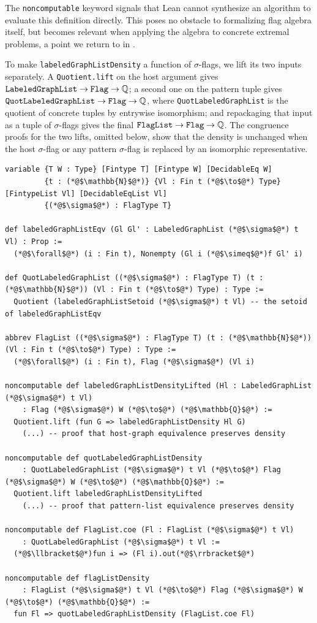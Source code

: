 \documentclass[acmsmall,screen=true,acmthm=false]{acmart}
\DeclareRobustCommand{\lean}[1]{{\def\_{\textunderscore\allowbreak}\texttt{#1}}}
\begin{document}
The \lean{noncomputable} keyword signals that Lean cannot synthesize an
algorithm to evaluate this definition directly.  This poses no obstacle to
formalizing flag algebra itself, but becomes relevant when applying the algebra
to concrete extremal problems, a point we return to in .

To make \lean{labeledGraphListDensity} a function of $\sigma$-flags, we lift
its two inputs separately.  A \lean{Quotient.lift} on the host argument gives
\(\lean{LabeledGraphList}\to\lean{Flag}\to\mathbb{Q}\); a second one on the
pattern tuple gives
\(\lean{QuotLabeledGraphList}\to\lean{Flag}\to\mathbb{Q}\), where
\lean{QuotLabeledGraphList} is the quotient of concrete tuples by entrywise
isomorphism; and repackaging that input as a tuple of $\sigma$-flags gives the
final \(\lean{FlagList}\to\lean{Flag}\to\mathbb{Q}\).  The congruence proofs
for the two lifts, omitted below, show that the density is unchanged when the
host $\sigma$-flag or any pattern $\sigma$-flag is replaced by an isomorphic
representative.
\begin{lstlisting}
variable {T W : Type} [Fintype T] [Fintype W] [DecidableEq W]
         {t : (*@$\mathbb{N}$@*)} {Vl : Fin t (*@$\to$@*) Type} [FintypeList Vl] [DecidableEqList Vl]
         {(*@$\sigma$@*) : FlagType T}

def labeledGraphListEqv (Gl Gl' : LabeledGraphList (*@$\sigma$@*) t Vl) : Prop :=
  (*@$\forall$@*) (i : Fin t), Nonempty (Gl i (*@$\simeq$@*)f Gl' i)

def QuotLabeledGraphList ((*@$\sigma$@*) : FlagType T) (t : (*@$\mathbb{N}$@*)) (Vl : Fin t (*@$\to$@*) Type) : Type :=
  Quotient (labeledGraphListSetoid (*@$\sigma$@*) t Vl) -- the setoid of labeledGraphListEqv

abbrev FlagList ((*@$\sigma$@*) : FlagType T) (t : (*@$\mathbb{N}$@*)) (Vl : Fin t (*@$\to$@*) Type) : Type :=
  (*@$\forall$@*) (i : Fin t), Flag (*@$\sigma$@*) (Vl i)

noncomputable def labeledGraphListDensityLifted (Hl : LabeledGraphList (*@$\sigma$@*) t Vl)
    : Flag (*@$\sigma$@*) W (*@$\to$@*) (*@$\mathbb{Q}$@*) :=
  Quotient.lift (fun G => labeledGraphListDensity Hl G)
    (...) -- proof that host-graph equivalence preserves density

noncomputable def quotLabeledGraphListDensity
    : QuotLabeledGraphList (*@$\sigma$@*) t Vl (*@$\to$@*) Flag (*@$\sigma$@*) W (*@$\to$@*) (*@$\mathbb{Q}$@*) :=
  Quotient.lift labeledGraphListDensityLifted
    (...) -- proof that pattern-list equivalence preserves density

noncomputable def FlagList.coe (Fl : FlagList (*@$\sigma$@*) t Vl)
    : QuotLabeledGraphList (*@$\sigma$@*) t Vl :=
  (*@$\llbracket$@*)fun i => (Fl i).out(*@$\rrbracket$@*)

noncomputable def flagListDensity
    : FlagList (*@$\sigma$@*) t Vl (*@$\to$@*) Flag (*@$\sigma$@*) W (*@$\to$@*) (*@$\mathbb{Q}$@*) :=
  fun Fl => quotLabeledGraphListDensity (FlagList.coe Fl)
\end{lstlisting}
\end{document}

